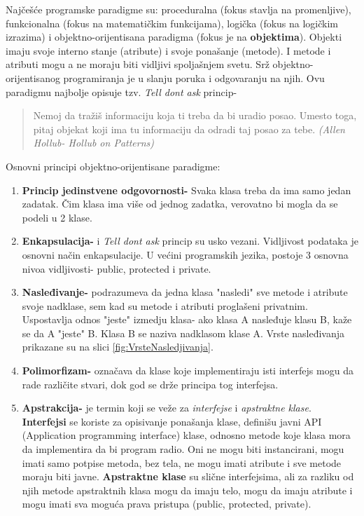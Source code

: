 \documentclass[a4paper]{article}
\begin{document}
{Najčešće programske paradigme su:
proceduralna (fokus stavlja na promenljive), funkcionalna (fokus na matematičkim funkcijama), logička (fokus na logičkim izrazima) i objektno-orijentisana paradigma (fokus je na  \textbf{objektima}). Objekti imaju svoje interno stanje (atribute) i svoje ponašanje (metode).  I metode i atributi mogu a ne moraju biti vidljivi spoljašnjem svetu. Srž objektno-orijentisanog programiranja je u slanju poruka i odgovaranju na njih.  Ovu paradigmu najbolje opisuje  tzv. {\em Tell dont ask} princip- 
\begin{quotation} 
Nemoj da tražiš informaciju koja ti treba da bi uradio posao. Umesto toga, pitaj objekat koji ima tu informaciju da odradi taj posao za tebe. {\em (Allen Hollub- Hollub on Patterns)} 
\end{quotation}
Osnovni principi objektno-orijentisane paradigme:
\begin{enumerate}
\item \textbf{Princip jedinstvene odgovornosti-}  Svaka klasa treba da ima samo jedan zadatak. Čim klasa ima više od jednog zadatka, verovatno bi mogla da se podeli u 2 klase.
\item \textbf{Enkapsulacija-} i {\em Tell dont ask} princip su usko vezani. Vidljivost podataka je osnovni način enkapsulacije. U većini programskih jezika, postoje 3 osnovna nivoa vidljivosti- public, protected i private.
\item \textbf{Nasleđivanje-} podrazumeva da jedna klasa "nasledi" sve metode i atribute svoje nadklase, sem kad su metode i atributi proglašeni privatnim. Uspostavlja odnos "jeste" izmedju klasa- ako klasa A nasleđuje klasu B, kaže se da A "jeste" B. Klasa B se naziva nadklasom klase A. 
Vrste nasleđivanja prikazane su na slici \ref{fig:VrsteNasledjivanja}.
\item \textbf{Polimorfizam-} označava da klase koje implementiraju isti interfejs mogu da rade različite stvari, dok god se drže principa tog interfejsa. 
\item \textbf{Apstrakcija-} je termin koji se veže za {\em interfejse} i {\em apstraktne klase}. \textbf{Interfejsi} se koriste za opisivanje ponašanja klase, definišu javni API (Application programming interface) klase, odnosno metode koje klasa mora da implementira da bi program radio. Oni ne mogu biti instancirani, mogu imati samo potpise metoda, bez tela, ne mogu imati atribute i sve metode moraju biti javne. \textbf{Apstraktne klase} su slične interfejsima, ali za razliku od njih metode apstraktnih klasa mogu da imaju telo, mogu da imaju atribute i mogu imati sva moguća prava pristupa (public, protected, private). 
\end{enumerate}

}
\end{document}
